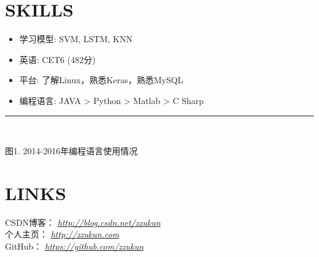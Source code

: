 \documentclass[line, margin]{res}
\newcommand{\xiaowu}{\fontsize{9pt}{15.75pt}\selectfont} %
\begin{document}
\begin{resume}
\section{SKILLS}
\begin{itemize}
\item { 学习模型: }SVM, LSTM, KNN
\item { 英语: CET6 (482分)}
\item { 平台: 了解Linux，熟悉Keras，熟悉MySQL}
\item { 编程语言: }JAVA > Python > Matlab > C Sharp
\end{itemize}

\rule{13.0cm}{0.05em} \\
\begin{center}
{\xiaowu 图1. 2014-2016年编程语言使用情况}
\end{center}

\vspace {30pt}
\section {LINKS}
{ CSDN博客：} {\sl \url{http://blog.csdn.net/zzukun}}\\
[3pt]
{ 个人主页：} {\sl \url{http://zzukun.com}}\\
[3pt]
{ GitHub： } {\sl \url{https://github.com/zzukun}}\\

\end{resume}
\end{document}
